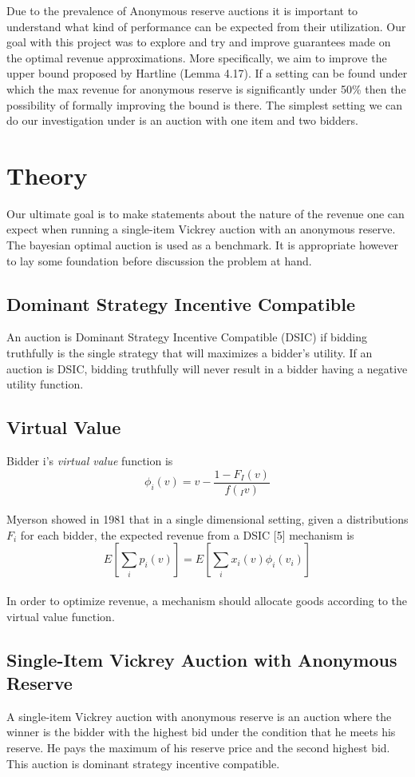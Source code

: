 \documentclass{acm_proc_article-sp}
\begin{document}
Due to the prevalence of Anonymous reserve auctions it is important to understand what kind of performance can be expected from their utilization. Our goal with this project was to explore and try and improve guarantees made on the optimal revenue approximations. More specifically, we aim to improve the upper bound proposed by Hartline (Lemma 4.17)\cite{hartline}. If a setting can be found under which the max revenue for anonymous reserve is significantly under 50\% then the possibility of formally improving the bound is there. The simplest setting we can do our investigation under is an auction with one item and two bidders.

\section{Theory}
Our ultimate goal is to make statements about the nature of the revenue one can expect when running a single-item Vickrey auction with an anonymous reserve. The bayesian optimal auction is used as a benchmark. It is appropriate however to lay some foundation before discussion the problem at hand.

\subsection{Dominant Strategy Incentive Compatible}
An auction is Dominant Strategy Incentive Compatible (DSIC) if bidding truthfully is the single strategy that will maximizes a bidder's utility. If an auction is DSIC, bidding truthfully will never result in a bidder having a negative utility function.

\subsection{Virtual Value}
Bidder i's \emph{virtual value} function is
\[ \phi_{i}(v) = v - \frac{1-F_{I}(v)}{f(_{I}v)}\] \\
Myerson showed in 1981 that in a single dimensional setting, given a distributions $F_i$ for each bidder, the expected revenue from a DSIC [5] mechanism is 
\[ E[\sum_{i} p_{i}(v)] = E[\sum_{i} x_{i}(v)\phi_{i}(v_{i})] \] \\
 In order to optimize revenue, a mechanism should allocate goods according to the virtual value function.

\subsection{Single-Item Vickrey Auction with Anonymous Reserve}
A single-item Vickrey auction with anonymous reserve is an auction where the winner is the bidder with the highest bid under the condition that he meets his reserve. He pays the maximum of his reserve price and the second highest bid. This auction is dominant strategy incentive compatible.
\end{document}
